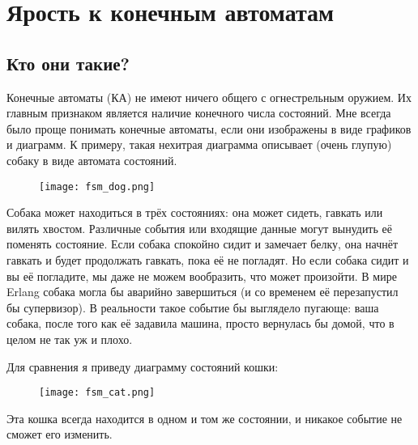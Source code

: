 \chapter{Ярость к конечным автоматам}
\label{rage-against-the-finite-state-machines}
\section{Кто они такие?}
\label{what-are-they}
Конечные автоматы (КА) не имеют ничего общего с огнестрельным оружием.
Их главным признаком является наличие конечного числа состояний.
Мне всегда было проще понимать конечные автоматы, если они изображены в виде графиков и диаграмм.
К примеру, такая нехитрая диаграмма описывает (очень глупую) собаку в виде автомата состояний.
\begin{figure}[h!]
    \centering
    \texttt{[image: fsm\_dog.png]}
\end{figure}
Собака может находиться в трёх состояниях: она может сидеть, гавкать или вилять хвостом.
Различные события или входящие данные могут вынудить её поменять состояние.
Если собака спокойно сидит и замечает белку, она начнёт гавкать и будет продолжать гавкать, пока её не погладят.
Но если собака сидит и вы её погладите, мы даже не можем вообразить, что может произойти.
В мире Erlang собака могла бы аварийно завершиться (и со временем её перезапустил бы супервизор).
В реальности такое событие бы выглядело пугающе: ваша собака, после того как её задавила машина, просто вернулась бы домой, что в целом не так уж и плохо.

Для сравнения я приведу диаграмму состояний кошки:

\begin{figure}[h!]
    \centering
    \texttt{[image: fsm\_cat.png]}
\end{figure}

Эта кошка всегда находится в одном и том же состоянии, и никакое событие не сможет его изменить.


